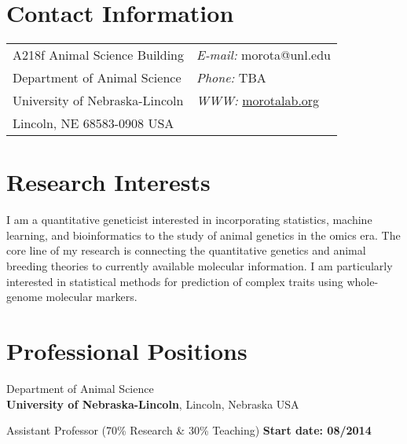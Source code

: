 \documentclass[margin,line,10pt]{res}
\begin{document}

\begin{resume}
\section{\sc Contact Information}
\vspace{.05in}
\begin{tabular}{@{}p{2in}p{4in}}
A218f Animal Science Building   & \hspace{2cm} {\it E-mail:}  morota@unl.edu\\       
Department of Animal Science  & \hspace{2cm} {\it Phone:} TBA\\     
University of Nebraska-Lincoln  & \hspace{2cm} {\it WWW:} \textcolor{blue}{\href{morotalab.org}{morotalab.org}  }\\
Lincoln, NE 68583-0908 USA & \\
\end{tabular}


\section{\sc Research Interests}
I am a quantitative geneticist interested in incorporating statistics, machine learning, 
and bioinformatics to the study of animal genetics in the omics era. 
The core line of my research is connecting the quantitative genetics and animal breeding theories to currently available molecular information. 
I am particularly interested in statistical methods for prediction of complex traits using whole-genome molecular markers. 




\section{\sc Professional   Positions}
Department of Animal Science\\
{\bf University of Nebraska-Lincoln}, Lincoln, Nebraska USA
\vspace{-.3cm}

Assistant Professor (70\% Research \& 30\% Teaching)   \hfill {\bf Start date: 08/2014}\\




\end{resume}
\end{document}
